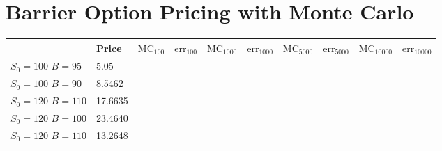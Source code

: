 \chapter{Barrier Option Pricing with Monte Carlo}

\begin{center}
    \begin{tabular}{ | m{4em} | m{1.3cm}| m{1.3cm} | m{1.3cm}| m{1.3cm} | m{1.3cm} | m{1.3cm} | m{1.3cm} | m{1.35cm} | m{1.3cm} |} 
  \hline
   & Price & $\text{MC}_{100}$ & $\text{err}_{100}$ & $\text{MC}_{1000}$ & $\text{err}_{1000}$ & $\text{MC}_{5000}$ & $\text{err}_{5000}$ & $\text{MC}_{10000}$ & $\text{err}_{10000}$  \\ 
  \hline
  $S_0=100$ $B=95$ & 5.05 &  & & & & & & &\\ 
  \hline
  $S_0=100$ $B=90$ & 8.5462 &  & & & & & & &\\ 
  \hline
  $S_0=120$ $B=110$ & 17.6635 &  &  & & & & & &\\ 
  \hline
  $S_0=120$ $B=100$ & 23.4640 &  & & & & & & &\\ 
  \hline
  $S_0=120$ $B=110$ & 13.2648 &  & & & & & & &\\ 
  \hline
\end{tabular}
\end{center}
